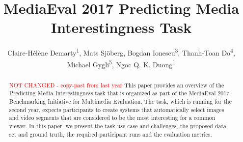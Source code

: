 \documentclass[sigconf]{acmart-me}
\begin{document}
\title{MediaEval 2017 Predicting Media Interestingness Task}



%
\author{Claire-H\'{e}l\`{e}ne Demarty\textsuperscript{1}, Mats Sj\"{o}berg, Bogdan Ionescu\textsuperscript{3}, Thanh-Toan Do\textsuperscript{4}, \\ Michael Gygli\textsuperscript{5}, Ngoc Q. K. Duong\textsuperscript{1}}



\renewcommand{\shortauthors}{C.H. Demarty et al.}


\begin{abstract}
\textcolor{red}{NOT CHANGED - copy-past from last year}
This paper provides an overview of the Predicting Media
Interestingness task that is organized as part of the Media\-Eval
2017 Benchmarking Initiative for Multimedia Evaluation. The task, which is
running for the second year, expects participants to create systems that automatically
select images and video segments that are considered to be the most
interesting for a common viewer. In this paper, we present the task use case and
challenges, the proposed data set and ground truth, the required
participant runs and the evaluation metrics.
\end{abstract}
\end{document}
